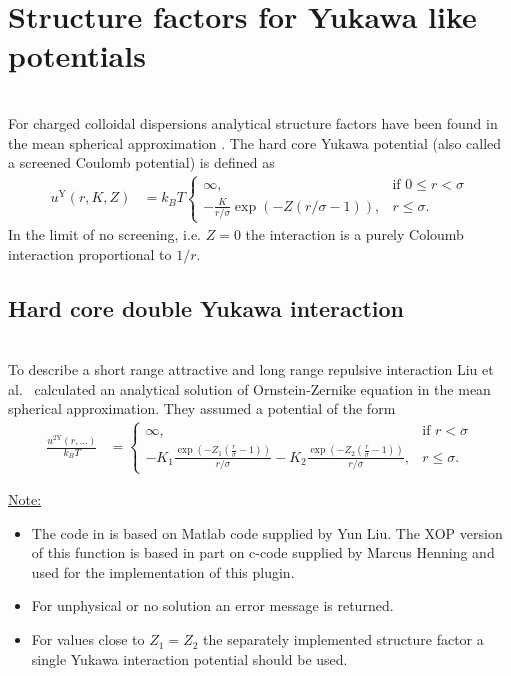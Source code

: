 \clearpage
\section{Structure factors for Yukawa like potentials}~\\
\label{sect:SQ4Yukawa}
For charged colloidal dispersions analytical structure factors have been found in the mean spherical approximation \cite{Hayter1981,Hansen1982,Liu2005}. The hard core Yukawa potential (also called a screened Coulomb potential) is defined as
\begin{align}
u^\mathrm{Y}(r,K,Z) &= k_BT \begin{cases}
                             \infty, & \mbox{if } 0\leq r < \sigma \\
                             -\frac{K}{r/\sigma}\exp(-Z (r/\sigma-1)), & r\leq \sigma.
                            \end{cases}
\end{align}
In the limit of no screening, i.e. $Z=0$ the interaction is a purely Coloumb interaction proportional to $1/r$.  

\subsection{Hard core double Yukawa interaction}~\\
\label{sect:SQ4doubleYukawa}
To describe a short range attractive and long range repulsive interaction Liu et al.\ \cite{Liu2005} calculated an analytical solution of Ornstein-Zernike equation in the mean spherical approximation. They assumed a potential of the form
\begin{align}\label{eq:SQ2Ypotential}
\frac{u^\mathrm{2Y}(r,\ldots)}{k_BT} &= \begin{cases}
                             \infty, & \mbox{if }  r < \sigma \\
                             -K_1\frac{\exp\left(-Z_1 \left(\frac{r}{\sigma}-1\right)\right)}{r/\sigma} -K_2\frac{\exp\left(-Z_2 \left(\frac{r}{\sigma}-1\right)\right)}{r/\sigma}, & r\leq \sigma.
                            \end{cases}
\end{align}

\noindent\underline{Note:}
\begin{itemize}
  \item The code in \SASfit is based on Matlab code supplied by Yun Liu. The XOP version of this function is based in part on c-code supplied by Marcus Henning and used for the implementation of this plugin.
  \item For unphysical or no solution an error message is returned.
  \item For values close to $Z_1=Z_2$ the separately implemented structure factor a single Yukawa interaction potential should be used.
\end{itemize} 